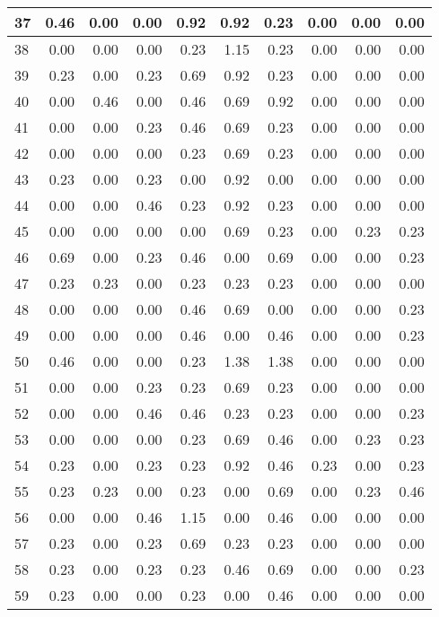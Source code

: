 \begin{table}
{\begin{tabular}[t]{l|r|r|r|r|r|r|r|r|r}
\hline
37 & 0.46 & 0.00 & 0.00 & 0.92 & 0.92 & 0.23 & 0.00 & 0.00 & 0.00\\
\hline
38 & 0.00 & 0.00 & 0.00 & 0.23 & 1.15 & 0.23 & 0.00 & 0.00 & 0.00\\
\hline
39 & 0.23 & 0.00 & 0.23 & 0.69 & 0.92 & 0.23 & 0.00 & 0.00 & 0.00\\
\hline
40 & 0.00 & 0.46 & 0.00 & 0.46 & 0.69 & 0.92 & 0.00 & 0.00 & 0.00\\
\hline
41 & 0.00 & 0.00 & 0.23 & 0.46 & 0.69 & 0.23 & 0.00 & 0.00 & 0.00\\
\hline
42 & 0.00 & 0.00 & 0.00 & 0.23 & 0.69 & 0.23 & 0.00 & 0.00 & 0.00\\
\hline
43 & 0.23 & 0.00 & 0.23 & 0.00 & 0.92 & 0.00 & 0.00 & 0.00 & 0.00\\
\hline
44 & 0.00 & 0.00 & 0.46 & 0.23 & 0.92 & 0.23 & 0.00 & 0.00 & 0.00\\
\hline
45 & 0.00 & 0.00 & 0.00 & 0.00 & 0.69 & 0.23 & 0.00 & 0.23 & 0.23\\
\hline
46 & 0.69 & 0.00 & 0.23 & 0.46 & 0.00 & 0.69 & 0.00 & 0.00 & 0.23\\
\hline
47 & 0.23 & 0.23 & 0.00 & 0.23 & 0.23 & 0.23 & 0.00 & 0.00 & 0.00\\
\hline
48 & 0.00 & 0.00 & 0.00 & 0.46 & 0.69 & 0.00 & 0.00 & 0.00 & 0.23\\
\hline
49 & 0.00 & 0.00 & 0.00 & 0.46 & 0.00 & 0.46 & 0.00 & 0.00 & 0.23\\
\hline
50 & 0.46 & 0.00 & 0.00 & 0.23 & 1.38 & 1.38 & 0.00 & 0.00 & 0.00\\
\hline
51 & 0.00 & 0.00 & 0.23 & 0.23 & 0.69 & 0.23 & 0.00 & 0.00 & 0.00\\
\hline
52 & 0.00 & 0.00 & 0.46 & 0.46 & 0.23 & 0.23 & 0.00 & 0.00 & 0.23\\
\hline
53 & 0.00 & 0.00 & 0.00 & 0.23 & 0.69 & 0.46 & 0.00 & 0.23 & 0.23\\
\hline
54 & 0.23 & 0.00 & 0.23 & 0.23 & 0.92 & 0.46 & 0.23 & 0.00 & 0.23\\
\hline
55 & 0.23 & 0.23 & 0.00 & 0.23 & 0.00 & 0.69 & 0.00 & 0.23 & 0.46\\
\hline
56 & 0.00 & 0.00 & 0.46 & 1.15 & 0.00 & 0.46 & 0.00 & 0.00 & 0.00\\
\hline
57 & 0.23 & 0.00 & 0.23 & 0.69 & 0.23 & 0.23 & 0.00 & 0.00 & 0.00\\
\hline
58 & 0.23 & 0.00 & 0.23 & 0.23 & 0.46 & 0.69 & 0.00 & 0.00 & 0.23\\
\hline
59 & 0.23 & 0.00 & 0.00 & 0.23 & 0.00 & 0.46 & 0.00 & 0.00 & 0.00\\

\end{tabular}}
\end{table}
